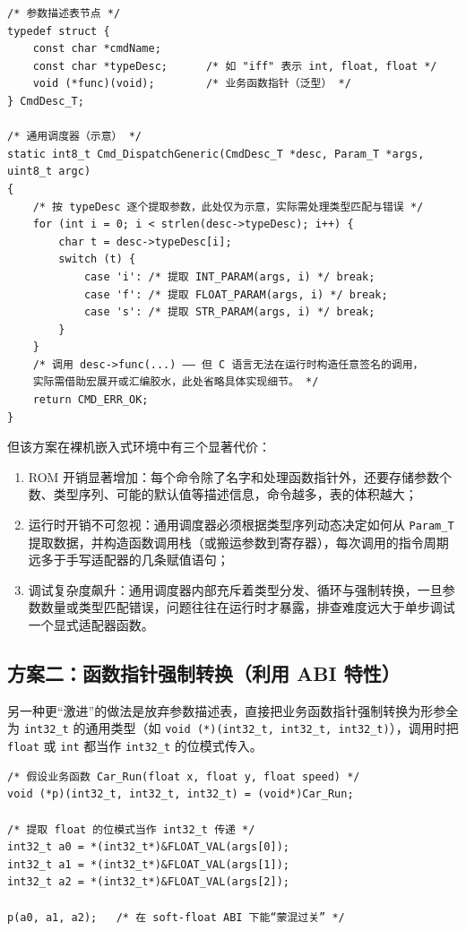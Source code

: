 \begin{lstlisting}[style=c]
/* 参数描述表节点 */
typedef struct {
	const char *cmdName;
	const char *typeDesc;      /* 如 "iff" 表示 int, float, float */
	void (*func)(void);        /* 业务函数指针（泛型） */
} CmdDesc_T;

/* 通用调度器（示意） */
static int8_t Cmd_DispatchGeneric(CmdDesc_T *desc, Param_T *args, uint8_t argc)
{
	/* 按 typeDesc 逐个提取参数，此处仅为示意，实际需处理类型匹配与错误 */
	for (int i = 0; i < strlen(desc->typeDesc); i++) {
		char t = desc->typeDesc[i];
		switch (t) {
			case 'i': /* 提取 INT_PARAM(args, i) */ break;
			case 'f': /* 提取 FLOAT_PARAM(args, i) */ break;
			case 's': /* 提取 STR_PARAM(args, i) */ break;
		}
	}
	/* 调用 desc->func(...) —— 但 C 语言无法在运行时构造任意签名的调用，
	实际需借助宏展开或汇编胶水，此处省略具体实现细节。 */
	return CMD_ERR_OK;
}
\end{lstlisting}

但该方案在裸机嵌入式环境中有三个显著代价：

\begin{enumerate}
	\item ROM 开销显著增加：每个命令除了名字和处理函数指针外，还要存储参数个数、类型序列、可能的默认值等描述信息，命令越多，表的体积越大；
	\item 运行时开销不可忽视：通用调度器必须根据类型序列动态决定如何从 \texttt{Param\_T} 提取数据，并构造函数调用栈（或搬运参数到寄存器），每次调用的指令周期远多于手写适配器的几条赋值语句；
	\item 调试复杂度飙升：通用调度器内部充斥着类型分发、循环与强制转换，一旦参数数量或类型匹配错误，问题往往在运行时才暴露，排查难度远大于单步调试一个显式适配器函数。
\end{enumerate}

\subsection*{方案二：函数指针强制转换（利用 ABI 特性）}

另一种更“激进”的做法是放弃参数描述表，直接把业务函数指针强制转换为形参全为 \texttt{int32\_t} 的通用类型（如 \texttt{void (*)(int32\_t, int32\_t, int32\_t)}），调用时把 \texttt{float} 或 \texttt{int} 都当作 \texttt{int32\_t} 的位模式传入。

\begin{lstlisting}[style=c]
/* 假设业务函数 Car_Run(float x, float y, float speed) */
void (*p)(int32_t, int32_t, int32_t) = (void*)Car_Run;

/* 提取 float 的位模式当作 int32_t 传递 */
int32_t a0 = *(int32_t*)&FLOAT_VAL(args[0]);
int32_t a1 = *(int32_t*)&FLOAT_VAL(args[1]);
int32_t a2 = *(int32_t*)&FLOAT_VAL(args[2]);

p(a0, a1, a2);   /* 在 soft-float ABI 下能“蒙混过关” */
\end{lstlisting}


